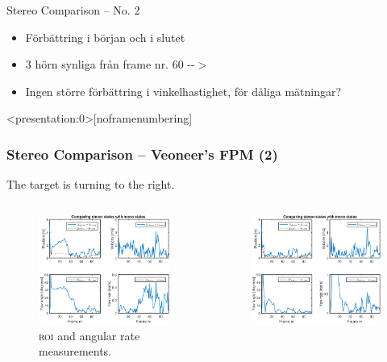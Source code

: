 \documentclass{beamer}
\newcommand{\roi}{\textsc{roi}\xspace}
\renewcommand{\a}{\r{a}\xspace}
\renewcommand{\aa}{\"a\xspace}
\renewcommand{\o}{\"o\xspace}
\begin{document}
\begin{frame}{Stereo Comparison -- No. 2}
	\note
	{
		\begin{itemize}
			\item F\o{}rb\aa{}ttring i b\o{}rjan och i slutet
			\item 3 h\o{}rn synliga fr\a{}n frame nr. 60 -{}-$>$
			\item Ingen st\o{}rre f\o{}rb\aa{}ttring i vinkelhastighet, f\o{}r d\a{}liga m\aa{}tningar?
		\end{itemize}
	}
\end{frame}

\begin{frame}<presentation:0>[noframenumbering]
	\frametitle{Stereo Comparison -- Veoneer's FPM (2)}
	The target is turning to the right.
	\begin{columns}
	\begin{figure}
		\centering
		\includegraphics[width=\textwidth]{Veoneer/155733_RoiAngVel_gate}
		\caption{\roi and angular rate measurements.}
	\end{figure}
	\begin{figure}
		\centering
		\includegraphics[width=\textwidth]{Veoneer/155733_AllMeasurements_gate}

\end{figure}
\end{columns}
\end{frame}
\end{document}
